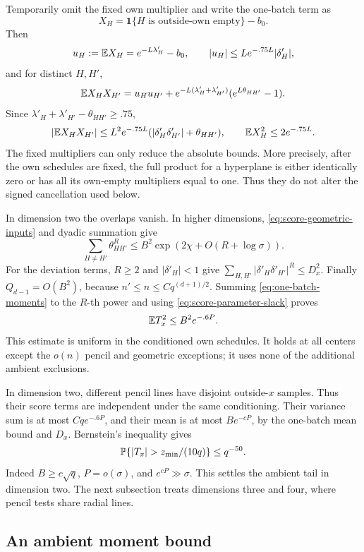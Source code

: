 Temporarily omit the fixed own multiplier and write the one-batch term as
\[
 X_H=\mathbf1\{H\text{ is outside-own empty}\}-b_0.
\]
Then
\[
 u_H:=\mathbb E X_H=e^{-L\lambda'_H}-b_0,
 \qquad |u_H|\le Le^{-.75L}|\delta'_H|,
\]
and for distinct \(H,H'\),
\[
 \mathbb E X_HX_{H'}=u_Hu_{H'}+
 e^{-L(\lambda'_H+\lambda'_{H'})}(e^{L\theta_{HH'}}-1).
\]
Since \(\lambda'_H+\lambda'_{H'}-\theta_{HH'}\ge .75\),
\begin{equation}
 |\mathbb E X_HX_{H'}|\le L^2e^{-.75L}
       (|\delta'_H\delta'_{H'}|+\theta_{HH'}),
 \qquad \mathbb E X_H^2\le2e^{-.75L}.
 \label{eq:one-batch-moments}
\end{equation}
The fixed multipliers can only reduce the absolute bounds.
More precisely, after the own schedules are fixed, the full product
for a hyperplane is either identically zero or has all its own-empty
multipliers equal to one.  Thus they do not alter the signed
cancellation used below.

In dimension two the overlaps vanish.  In higher dimensions,
\eqref{eq:score-geometric-inputs} and dyadic summation give
\[
 \sum_{H\ne H'}\theta_{HH'}^R
 \le B^2\exp(2\chi+O(R+\log\sigma)).
\]
For the deviation terms, \(R\ge2\) and \(|\delta'_H|<1\) give
\(\sum_{H,H'}|\delta'_H\delta'_{H'}|^R\le D_x^2\).
Finally \(Q_{d-1}=O(B^2)\), because
\(n'\le n\le Cq^{(d+1)/2}\).  Summing
\eqref{eq:one-batch-moments} to the \(R\)-th power and using
\eqref{eq:score-parameter-slack} proves
\begin{equation}
 \mathbb E T_x^2\le B^2e^{-.6P}.
 \label{eq:validation-second-moment}
\end{equation}
This estimate is uniform in the conditioned own schedules.  It holds
at all centers except the \(o(n)\) pencil and geometric exceptions;
it uses none of the additional ambient exclusions.

In dimension two, different pencil lines have disjoint outside-\(x\)
samples.  Thus their score terms are independent under the same
conditioning.  Their variance sum is at most \(Cqe^{-.6P}\), and their
mean is at most \(Be^{-cP}\), by the one-batch mean bound and \(D_x\).
Bernstein's inequality gives
\begin{equation}
 \PP\{|T_x|>z_{\min}/(10q)\}\le q^{-50}.
 \label{eq:score-dimension-two}
\end{equation}
Indeed \(B\ge c\sqrt q\), \(P=o(\sigma)\), and \(e^{cP}\gg\sigma\).
This settles the ambient tail in dimension two.  The next subsection
treats dimensions three and four, where pencil tests share radial lines.

\subsection{An ambient moment bound}
\label{subsec:score-high-moment}

